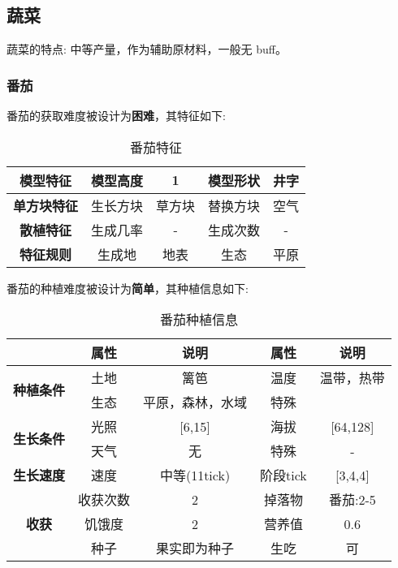 \subsection{蔬菜}

蔬菜的特点: 中等产量，作为辅助原材料，一般无 buff。

\subsubsection{番茄}

番茄的获取难度被设计为\textbf{困难}，其特征如下:
\begin{table}[H]
    \centering
    \caption{番茄特征}
    \label{table:番茄特征}
    \setlength{\tabcolsep}{4mm}
    \begin{tabular}{c|cc|cc}
        \toprule
        \textbf{模型特征}   & 模型高度 & 1      & 模型形状 & 井字 \\
        \midrule
        \textbf{单方块特征} & 生长方块 & 草方块 & 替换方块 & 空气 \\
        \midrule
        \textbf{散植特征}   & 生成几率 & -   & 生成次数 & -    \\
        \midrule
        \textbf{特征规则}   & 生成地   & 地表   & 生态     & 平原 \\
        \bottomrule
    \end{tabular}
\end{table}


番茄的种植难度被设计为\textbf{简单}，其种植信息如下:

\begin{table}[H]
    \centering
    \caption{番茄种植信息}
    \label{table:番茄种植信息}
    \setlength{\tabcolsep}{4mm}
    \begin{tabular}{c|cc|cc}
        \toprule
                                           & \textbf{属性} & \textbf{说明}    & \textbf{属性} & \textbf{说明} \\
        \midrule
        \multirow{2}{*}{\textbf{种植条件}} & 土地          & 篱笆      & 温度          & 温带，热带    \\
                                           & 生态          & 平原，森林，水域 & 特殊          &          \\
        \midrule
        \multirow{2}{*}{\textbf{生长条件}} & 光照          & [6,15]           & 海拔          & [64,128]      \\
                                           & 天气          & 无               & 特殊          & -             \\
        \midrule
        \textbf{生长速度}                  & 速度          & 中等(11tick)     & 阶段tick      & [3,4,4]       \\
        \midrule
        \multirow{3}{*}{\textbf{收获}}     & 收获次数      & 2                & 掉落物        & 番茄:2-5      \\
                                           & 饥饿度        & 2                & 营养值        & 0.6           \\
                                        & 种子 & 果实即为种子 & 生吃 & 可 \\
        \bottomrule
    \end{tabular}
\end{table}

